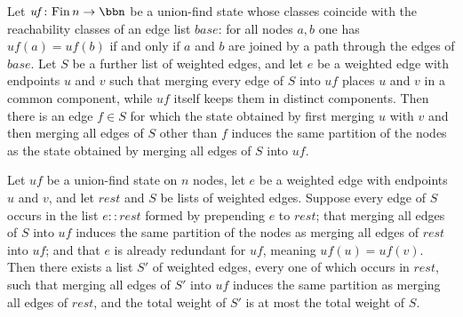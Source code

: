 \begin{lemma}
\label{Kruskal.uf_exchange}
\leanok
{}
Let $\mathit{uf}\colon \mathrm{Fin}\,n \to \bbn$ be a union-find state whose classes
coincide with the reachability classes of an edge list $\mathit{base}$: for all nodes
$a,b$ one has $\mathit{uf}(a) = \mathit{uf}(b)$ if and only if $a$ and $b$ are joined by
a path through the edges of $\mathit{base}$. Let $S$ be a further list of weighted
edges, and let $e$ be a weighted edge with endpoints $u$ and $v$ such that merging every
edge of $S$ into $\mathit{uf}$ places $u$ and $v$ in a common component, while
$\mathit{uf}$ itself keeps them in distinct components. Then there is an edge $f \in S$
for which the state obtained by first merging $u$ with $v$ and then merging all edges of
$S$ other than $f$ induces the same partition of the nodes as the state obtained by
merging all edges of $S$ into $\mathit{uf}$.
\end{lemma}

\begin{lemma}
\label{Kruskal.reduce_to_rest}
\leanok
{}
Let $\mathit{uf}$ be a union-find state on $n$ nodes, let $e$ be a weighted edge with
endpoints $u$ and $v$, and let $\mathit{rest}$ and $S$ be lists of weighted edges.
Suppose every edge of $S$ occurs in the list $e :: \mathit{rest}$ formed by prepending
$e$ to $\mathit{rest}$; that merging all edges of $S$ into $\mathit{uf}$ induces the
same partition of the nodes as merging all edges of $\mathit{rest}$ into $\mathit{uf}$;
and that $e$ is already redundant for $\mathit{uf}$, meaning $\mathit{uf}(u) =
\mathit{uf}(v)$. Then there exists a list $S'$ of weighted edges, every one of which
occurs in $\mathit{rest}$, such that merging all edges of $S'$ into $\mathit{uf}$
induces the same partition as merging all edges of $\mathit{rest}$, and the total weight
of $S'$ is at most the total weight of $S$.
\end{lemma}

